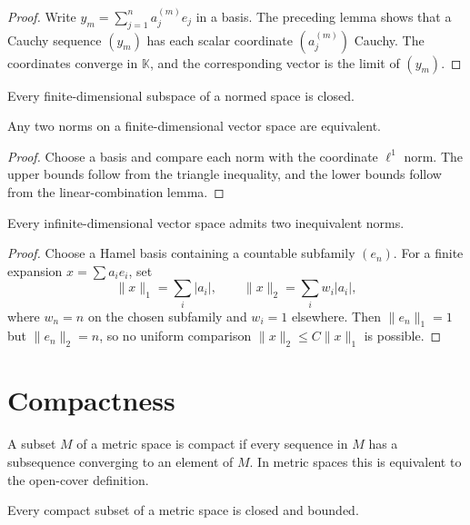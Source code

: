 \begin{proof}
Write $y_m=\sum_{j=1}^na_j^{(m)}e_j$ in a basis.  The preceding lemma shows
that a Cauchy sequence $(y_m)$ has each scalar coordinate
$(a_j^{(m)})$ Cauchy.  The coordinates converge in $\mathbb K$, and the
corresponding vector is the limit of $(y_m)$.
\end{proof}

\begin{notecorollary}
Every finite-dimensional subspace of a normed space is closed.
\end{notecorollary}

\begin{notetheorem}
Any two norms on a finite-dimensional vector space are equivalent.
\end{notetheorem}

\begin{proof}
Choose a basis and compare each norm with the coordinate $\ell^1$ norm.  The
upper bounds follow from the triangle inequality, and the lower bounds follow
from the linear-combination lemma.
\end{proof}

\begin{notetheorem}
Every infinite-dimensional vector space admits two inequivalent norms.
\end{notetheorem}

\begin{proof}
Choose a Hamel basis containing a countable subfamily $(e_n)$.  For a finite
expansion $x=\sum a_ie_i$, set
\[
  \|x\|_1=\sum_i|a_i|,
  \qquad
  \|x\|_2=\sum_iw_i|a_i|,
\]
where $w_n=n$ on the chosen subfamily and $w_i=1$ elsewhere.  Then
$\|e_n\|_1=1$ but $\|e_n\|_2=n$, so no uniform comparison
$\|x\|_2\le C\|x\|_1$ is possible.
\end{proof}

\section{Compactness}

\begin{notedefinition}
A subset $M$ of a metric space is compact if every sequence in $M$ has a
subsequence converging to an element of $M$.  In metric spaces this is
equivalent to the open-cover definition.
\end{notedefinition}

\begin{notelemma}
Every compact subset of a metric space is closed and bounded.
\end{notelemma}

